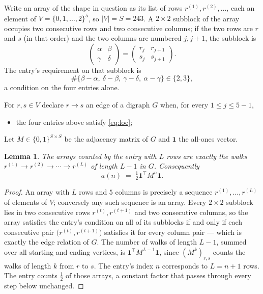 \documentclass[11pt,a4paper]{article}
\theoremstyle{plain}
\newtheorem{lemma}[theorem]{Lemma}
\theoremstyle{definition}
\begin{document}
Write an array of the shape in question as its list of rows
$r^{(1)},r^{(2)},\dots$, each an element of
$V=\{0,1,\dots,2\}^{5}$, so $|V|=S=243$. A $2\times2$ subblock of the array
occupies two consecutive rows and two consecutive columns; if the two rows are $r$
and $s$ (in that order) and the two columns are numbered $j,j+1$,
the subblock is
\[
\begin{pmatrix}\alpha&\beta\\\gamma&\delta\end{pmatrix}=\begin{pmatrix}r_j&r_{j+1}\\s_j&s_{j+1}\end{pmatrix}.
\]
The entry's requirement on that subblock is
\begin{equation}\label{eq:loc}
\#\{\beta-\alpha,\ \delta-\beta,\ \gamma-\delta,\ \alpha-\gamma\}\in\{2,3\},
\end{equation}
a condition on the four entries alone.

For $r,s\in V$ declare $r\to s$ an edge of a digraph $G$ when, for every
$1\le j\le 5-1$,
\begin{itemize}
\item the four entries above satisfy \eqref{eq:loc};

\end{itemize}
Let $M\in\{0,1\}^{S\times S}$ be the adjacency matrix of $G$ and $\mathbf{1}$ the
all-ones vector.

\begin{lemma}\label{lem:walk}
The arrays counted by the entry with $L$ rows are exactly the walks
$r^{(1)}\to r^{(2)}\to\cdots\to r^{(L)}$ of length $L-1$ in $G$. Consequently
\[
a(n)\;=\;\tfrac1{2}\mathbf{1}^{\!\top}M^{n}\mathbf{1} .
\]
\end{lemma}

\begin{proof}
An array with $L$ rows and $5$ columns is precisely a sequence
$r^{(1)},\dots,r^{(L)}$ of elements of $V$; conversely any such sequence is an array.
Every $2\times2$ subblock lies in two consecutive rows $r^{(t)},r^{(t+1)}$ and two
consecutive columns, so the array satisfies the entry's condition on all of its subblocks
if and only if each consecutive pair $\bigl(r^{(t)},r^{(t+1)}\bigr)$ satisfies it for
every column pair --- which is exactly the edge relation of $G$. The number of walks of
length $L-1$, summed over all starting and ending vertices, is
$\mathbf{1}^{\!\top}M^{L-1}\mathbf{1}$, since $(M^{k})_{r,s}$ counts the walks of
length $k$ from $r$ to $s$. The entry's index $n$ corresponds to $L=n+1$ rows. The entry counts $\tfrac1{2}$ of those arrays, a constant factor that passes through every step below unchanged.
\end{proof}
\end{document}
